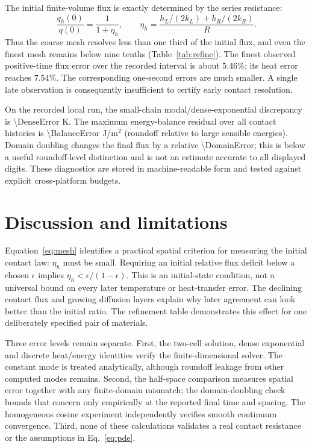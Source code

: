 \documentclass[11pt,a4paper]{article}
\begin{document}
The initial finite-volume flux is exactly determined by the series resistance:
\begin{equation}
 \frac{q_h(0)}{q(0)}=\frac{1}{1+\eta_h},\qquad
 \eta_h=\frac{h_L/(2k_L)+h_R/(2k_R)}{R}. \label{eq:mesh}
\end{equation}
Thus the coarse mesh resolves less than one third of the initial flux, and
even the finest mesh remains below nine tenths (Table~\ref{tab:refine}).
The finest observed positive-time flux error over the recorded interval is
about $5.46\%$; its heat error reaches $7.54\%$. The corresponding one-second
errors are much smaller. A single late observation is consequently insufficient
to certify early contact resolution.

On the recorded local run, the small-chain modal/dense-exponential discrepancy
is \num{\DenseError} K. The maximum energy-balance residual over all contact
histories is \num{\BalanceError} J/m$^2$ (roundoff relative to large sensible
energies). Domain doubling changes the final flux by a relative
\num{\DomainError}; this is below a useful roundoff-level distinction and is
not an estimate accurate to all displayed digits. These diagnostics are stored
in machine-readable form and tested against explicit cross-platform budgets.
\clearpage

\section{Discussion and limitations}
Equation~\eqref{eq:mesh} identifies a practical spatial criterion for measuring
the initial contact law: $\eta_h$ must be small. Requiring an initial relative
flux deficit below a chosen $\epsilon$ implies
$\eta_h<\epsilon/(1-\epsilon)$. This is an initial-state condition, not a
universal bound on every later temperature or heat-transfer error. The declining
contact flux and growing diffusion layers explain why later agreement can look
better than the initial ratio. The refinement table demonstrates this effect
for one deliberately specified pair of materials.

Three error levels remain separate. First, the two-cell solution, dense
exponential and discrete heat/energy identities verify the finite-dimensional
solver. The constant mode is treated analytically, although roundoff leakage
from other computed modes remains. Second, the half-space comparison measures
spatial error together with any finite-domain mismatch; the domain-doubling
check bounds that concern only empirically at the reported final time and
spacing. The homogeneous cosine experiment independently verifies smooth
continuum convergence. Third, none of these calculations validates a real
contact resistance or the assumptions in Eq.~\eqref{eq:pde}.
\end{document}
